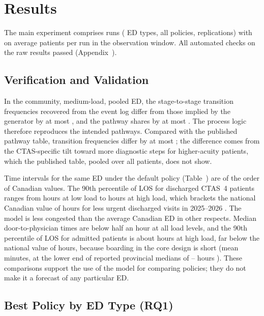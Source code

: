 \section{Results}
\label{sec:results}

The main experiment comprises \NRuns{} runs (\NEdTypes{} ED types, all policies, \Reps{} replications) with on average \PatientsPerRunMean{} patients per run in the observation window. All automated checks on the raw results passed (Appendix~).

\subsection{Verification and Validation}
\label{sec:res:vv}

In the community, medium-load, pooled ED, the stage-to-stage transition frequencies recovered from the event log differ from those implied by the generator by at most \TransMaxDiffGen{}, and the pathway shares by at most \PathMaxDiffGen{}. The process logic therefore reproduces the intended pathways. Compared with the published pathway table, transition frequencies differ by at most \TransMaxDiffPub{}; the difference comes from the CTAS-specific tilt toward more diagnostic steps for higher-acuity patients, which the published table, pooled over all patients, does not show.

Time intervals for the same ED under the default policy (Table~) are of the order of Canadian values. The 90th percentile of LOS for discharged CTAS~4 patients ranges from \FvLosCtasFourPNinetyLow{} hours at low load to \FvLosCtasFourPNinetyHigh{} hours at high load, which brackets the national Canadian value of \CihiNonAdmPNinety{} hours for less urgent discharged visits in 2025--2026 \cite{CIHI2026_NACRS}. The model is less congested than the average Canadian ED in other respects. Median door-to-physician times are below half an hour at all load levels, and the 90th percentile of LOS for admitted patients is about \FvLosAdmPNinetyHigh{} hours at high load, far below the national value of \CihiAdmPNinety{} hours, because boarding in the core design is short (mean \BoardLowMean{} minutes, at the lower end of reported provincial medians of \ProvBedWaitLow--\ProvBedWaitHigh{} hours \cite{Li2023_EDOvercrowdingCADTH}). These comparisons support the use of the model for comparing policies; they do not make it a forecast of any particular ED.

\subsection{Best Policy by ED Type (RQ1)}

